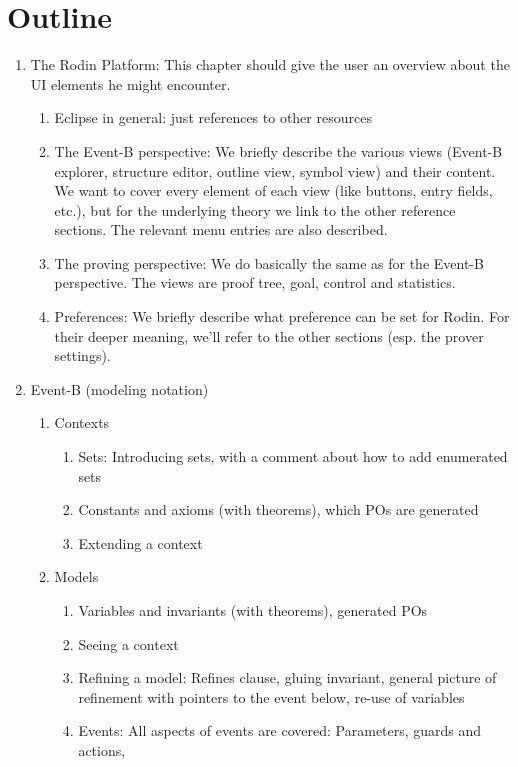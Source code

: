 
\section{Outline}

\begin{enumerate}
\item The Rodin Platform: This chapter should give the user an overview
  about the UI elements he might encounter.
  \begin{enumerate}
  \item Eclipse in general: just references to other resources
  \item The Event-B perspective: We briefly describe the various views
    (Event-B explorer, structure editor, outline view, symbol view)
    and their content.
    We want to cover every element of each view (like buttons, entry fields, etc.),
    but for the underlying theory we link to the other reference sections.
    The relevant menu entries are also described.
  \item The proving perspective: We do basically the same as for the Event-B perspective.
    The views are proof tree, goal, control and statistics.
  \item Preferences: We briefly describe what preference can be set for Rodin.
    For their deeper meaning, we'll refer to the other sections (esp. the prover settings).
  \end{enumerate}
\item Event-B (modeling notation)
  \begin{enumerate}
  \item Contexts
    \begin{enumerate}
    \item Sets: Introducing sets, with a comment about how to add enumerated sets
    \item Constants and axioms (with theorems), which POs are generated
    \item Extending a context
    \end{enumerate}
  \item Models
    \begin{enumerate}
    \item Variables and invariants (with theorems), generated POs 
    \item Seeing a context
    \item Refining a model: Refines clause, gluing invariant, general picture of refinement with
      pointers to the event below, re-use of variables
    \item Events: All aspects of events are covered: Parameters, guards and actions,

\end{enumerate}
\end{enumerate}
\end{enumerate}
